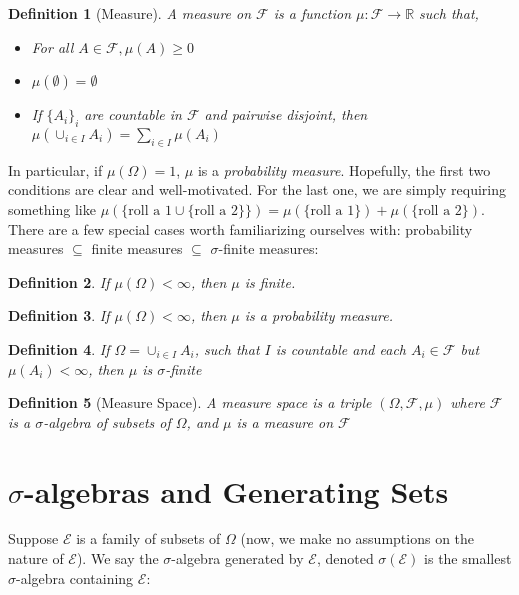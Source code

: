 \documentclass{report}
\newcommand{\F}{\mathcal F}
\newcommand{\E}{\mathcal E}
\newtheorem{definition}{Definition}
\begin{document}
\begin{definition}[Measure] A measure on $\F$ is a function $\mu : \F \to \mathbb R$ such that, 
    \begin{itemize}
        \item For all $A \in \F, \mu(A) \geq 0$
        \item $\mu(\emptyset) = \emptyset$
        \item If $\{A_i\}_i$ are countable in $\F$ and pairwise disjoint, then $\mu(\cup_{i \in I}A_i ) = \sum_{i \in I}\mu(A_i)$
    \end{itemize}
\end{definition}

In particular, if $\mu(\Omega) = 1$, $\mu$ is a \emph{probability measure}.
Hopefully, the first two conditions are clear and well-motivated. For the last one, we are simply requiring something like 
$\mu(\{\text{roll a 1} \cup \{\text{roll a 2}\}\}) = \mu(\{\text{roll a 1}\}) + \mu(\{\text{roll a 2}\})$. There are a few 
special cases worth familiarizing ourselves with: probability measures $\subseteq$ finite measures $\subseteq$ $\sigma$-finite measures: 

\begin{definition}
    If $\mu(\Omega) < \infty$, then $\mu$ is finite.
\end{definition}

\begin{definition}
    If $\mu(\Omega) < \infty$, then $\mu$ is a probability measure.
\end{definition}

\begin{definition}
    If $\Omega = \cup_{i \in I}A_i$, such that $I$ is countable and each $A_i \in \F$ but 
    $\mu(A_i) < \infty$, then $\mu$ is $\sigma$-finite
\end{definition}

\begin{definition}[Measure Space] \label{def:measure space} A measure space is  a triple $(\Omega, \F, \mu)$ where 
    $\F$ is a $\sigma$-algebra of subsets of $\Omega$, and $\mu$ is a measure on $\F$
\end{definition}

\section{$\sigma$-algebras and Generating Sets}

Suppose $\E$ is a family of subsets of $\Omega$ (now, we make no assumptions on the 
nature of $\E$). We say the $\sigma$-algebra generated by $\E$, denoted $\sigma(\E)$ is 
the smallest $\sigma$-algebra containing $\E$: 
\end{document}
